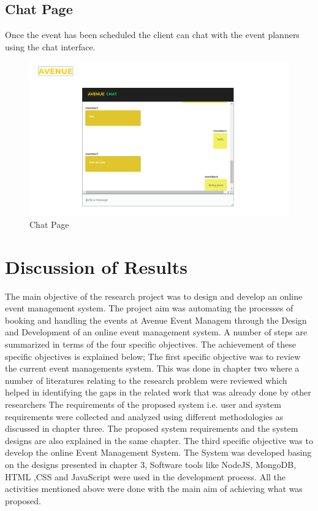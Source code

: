\subsection{Chat Page}
Once the event has been scheduled the client can chat with the event planners using the chat interface.
\begin{figure}[H]
	\centering
	\includegraphics[scale=0.4]{chatpage.png}
	\caption{Chat Page}
	\label{Chat Page}
\end{figure}

\section{Discussion of Results   }
The main objective of the research project was to design and develop an online event management system. The project aim was automating the processes of booking and handling the events at Avenue Event Managem
through the Design and Development of an online event management system.
\newline
A number of steps are summarized in terms of the four specific objectives. The achievement of these specific objectives is explained
below; 
 \newline
The first specific objective was to review the current event managements system. This
was done in chapter two where a number of literatures relating to the research problem
were reviewed which helped in identifying the gaps in the related work that was already
done by other researchers \newline
The requirements of the proposed system i.e. user and system requirements were
collected and analyzed using different methodologies as discussed in chapter three. The proposed system requirements and the system designs are also explained in the same chapter.
\newline
The third specific objective was to develop the online Event Management System. The
System was developed basing on the designs presented in chapter 3, Software
tools like NodeJS, MongoDB, HTML ,CSS and JavaScript were used in the development
process. \newline
All the activities mentioned above were done with the main aim of achieving what was
proposed.












